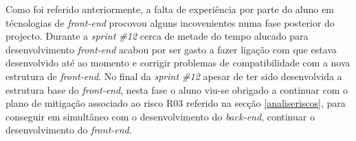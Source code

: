 Como foi referido anteriormente, a falta de experiência por parte do aluno em técnologias de \textit{front-end} procovou alguns incovenientes numa fase posterior do projecto. Durante a \textit{sprint \#12} cerca de metade do tempo alucado para desenvolvimento \textit{front-end} acabou por ser gasto a fazer ligação com que estava desenvolvido até ao momento e corrigir problemas de compatibilidade com a nova estrutura de \textit{front-end}. No final da \textit{sprint \#12} apesar de ter sido desenvolvida a estrutura base do \textit{front-end}, nesta fase o aluno viu-se obrigado a continuar com o plano de mitigação associado ao risco R03 referido na secção \ref{analiseriscos}, para conseguir em simultâneo com o desenvolvimento do \textit{back-end}, continuar o desenvolvimento do \textit{front-end}.






\blankpage

\glsresetall
